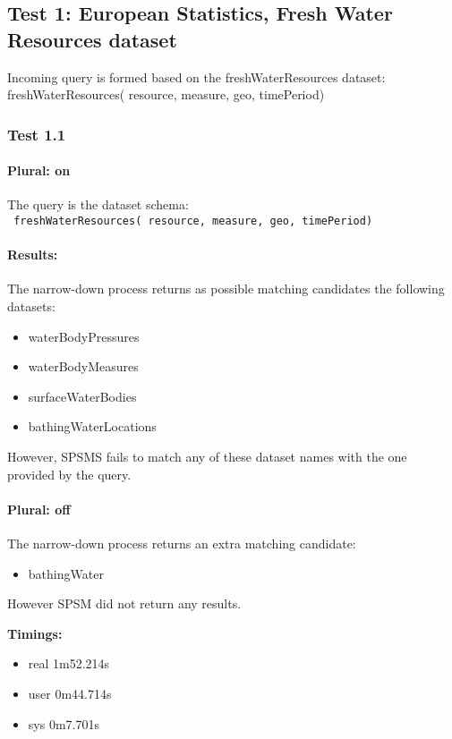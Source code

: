 \documentclass[a4paper,10pt]{article}
\begin{document}

\subsection{Test 1: European Statistics, Fresh Water Resources dataset}

Incoming query is formed based on the freshWaterResources dataset: \\
\indent freshWaterResources( resource, measure, geo, timePeriod)


\subsubsection{Test 1.1}
\paragraph{Plural: on}The query is the dataset schema:\\
 \indent \texttt{ freshWaterResources( resource, measure, geo, timePeriod)}

\paragraph{Results: } The narrow-down process returns as possible matching candidates the following datasets: 

\begin{itemize}
\item waterBodyPressures
\item waterBodyMeasures
\item surfaceWaterBodies
\item bathingWaterLocations
\end{itemize}

However, SPSMS fails to match any of these dataset names with the one provided by the query.

\paragraph{Plural: off}
The narrow-down process returns an extra matching candidate: 
\begin{itemize}
\item bathingWater
\end{itemize}
However SPSM did not return any results. 

\textbf{Timings:} 
\begin{itemize}
\item real	1m52.214s
\item user	0m44.714s
\item sys	0m7.701s
\end{itemize}
\end{document}
